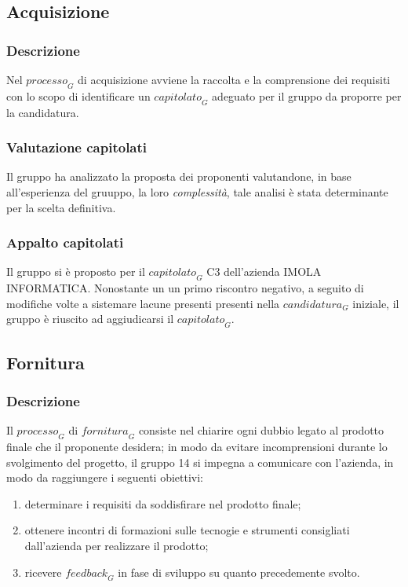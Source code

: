 \subsection{Acquisizione}
\subsubsection{Descrizione}
Nel $\textit{processo}_G$ di acquisizione avviene la raccolta e la comprensione dei requisiti con lo scopo di identificare un $\textit{capitolato}_G$ adeguato per il gruppo da proporre per la candidatura.
\subsubsection{Valutazione capitolati}
Il gruppo ha analizzato la proposta dei proponenti valutandone, in base all'esperienza del gruuppo, la loro \textit{complessità}, tale analisi è stata determinante per la scelta definitiva.
\subsubsection{Appalto capitolati}
Il gruppo si è proposto per il $\textit{capitolato}_G$ C3 dell'azienda IMOLA INFORMATICA. Nonostante un  un primo riscontro negativo, a seguito di modifiche volte a sistemare lacune presenti  presenti nella $\textit{candidatura}_G$ iniziale, il gruppo è riuscito ad aggiudicarsi il $\textit{capitolato}_G$.

\subsection{Fornitura}
\subsubsection{Descrizione}
Il $\textit{processo}_G$ di $\textit{fornitura}_G$ consiste nel chiarire ogni dubbio legato al prodotto finale che il proponente desidera; in modo da evitare incomprensioni durante lo svolgimento del progetto, il gruppo 14 si impegna a comunicare con l'azienda, in modo da raggiungere i seguenti obiettivi:
\begin{enumerate}
    \item determinare i requisiti da soddisfirare nel prodotto finale;
    \item ottenere incontri di formazioni sulle tecnogie e strumenti consigliati dall'azienda per realizzare il prodotto;
    \item ricevere $\textit{feedback}_G$ in fase di sviluppo su quanto precedemente svolto.
\end{enumerate}
